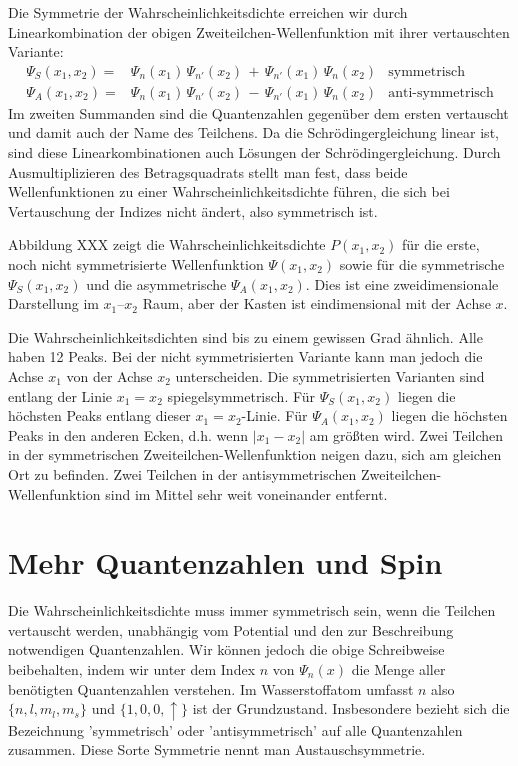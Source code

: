 Die Symmetrie der Wahrscheinlichkeitsdichte erreichen wir durch Linearkombination der obigen Zweiteilchen-Wellenfunktion mit ihrer vertauschten Variante:
\begin{align}
    \Psi_S(x_1, x_2) = & \Psi_{n}(x_1) \, \Psi_{n'}(x_2) \, + \, \Psi_{n'}(x_1) \, \Psi_{n}(x_2) & \text{symmetrisch}
    \label{eq:6_sym_WF} \\
    \Psi_A(x_1, x_2) = & \Psi_{n}(x_1) \, \Psi_{n'}(x_2) \, - \, \Psi_{n'}(x_1) \, \Psi_{n}(x_2) & \text{anti-symmetrisch} 
    \label{eq:6_asym_WF} 
\end{align}
Im zweiten Summanden sind die Quantenzahlen gegenüber dem ersten vertauscht und damit auch der Name des Teilchens. Da die Schrödingergleichung linear ist, sind diese Linearkombinationen auch Lösungen der Schrödingergleichung.
Durch Ausmultiplizieren des Betragsquadrats stellt man fest, dass beide Wellenfunktionen zu einer Wahrscheinlichkeitsdichte führen, die sich bei Vertauschung der Indizes nicht ändert, also symmetrisch ist.

Abbildung XXX zeigt die Wahrscheinlichkeitsdichte $ P(x_1, x_2) $ für die erste, noch nicht symmetrisierte Wellenfunktion $ \Psi(x_1, x_2)$ sowie für die symmetrische $ \Psi_S(x_1, x_2)$ und die asymmetrische $ \Psi_A(x_1, x_2)$. Dies ist eine zweidimensionale Darstellung im $x_1$--$x_2$ Raum, aber der Kasten ist eindimensional mit der Achse $x$.


Die Wahrscheinlichkeitsdichten sind bis zu einem gewissen Grad ähnlich. Alle haben 12 Peaks. Bei der nicht symmetrisierten Variante kann man jedoch die Achse $x_1$ von der Achse $x_2$ unterscheiden.
Die symmetrisierten Varianten sind entlang der Linie $x_1 = x_2$ spiegelsymmetrisch. Für $\Psi_S(x_1, x_2)$ liegen die höchsten Peaks entlang dieser $x_1 = x_2$-Linie. Für $\Psi_A(x_1, x_2)$ liegen die höchsten Peaks in den anderen Ecken, d.h. wenn $|x_1 - x_2|$ am größten wird. Zwei Teilchen in der symmetrischen Zweiteilchen-Wellenfunktion neigen dazu, sich am gleichen Ort zu befinden. Zwei Teilchen in der antisymmetrischen Zweiteilchen-Wellenfunktion sind im Mittel sehr weit voneinander entfernt.


\section{Mehr Quantenzahlen und Spin}

Die Wahrscheinlichkeitsdichte muss immer symmetrisch sein, wenn die Teilchen vertauscht werden, unabhängig vom Potential und den zur Beschreibung notwendigen Quantenzahlen. Wir können jedoch die obige Schreibweise beibehalten, indem wir unter dem Index $n$ von $\Psi_n(x)$ die Menge aller benötigten Quantenzahlen verstehen. Im Wasserstoffatom umfasst $n$ also $\{ n, l, m_l, m_s \}$ und $\{ 1, 0, 0, \uparrow \}$ ist der Grundzustand. Insbesondere bezieht sich die Bezeichnung 'symmetrisch' oder 'antisymmetrisch' auf alle Quantenzahlen zusammen. Diese Sorte Symmetrie nennt man Austauschsymmetrie.



